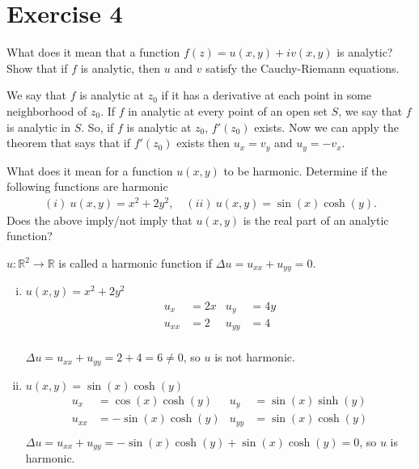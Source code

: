 \documentclass{report}
\def\R{\mathbb{R}}
\renewcommand{\sin}[1]{\operatorname{sin}\left(#1\right)}
\renewcommand{\cos}[1]{\operatorname{cos}\left(#1\right)}
\renewcommand{\sinh}[1]{\operatorname{sinh}\left(#1\right)}
\renewcommand{\cosh}[1]{\operatorname{cosh}\left(#1\right)}
\begin{document}
    \section*{Exercise 4}
    \begin{tcolorbox}[title=Part a]
        What does it mean that a function $f(z)=u(x,y)+iv(x,y)$ is analytic? Show that if $f$ is analytic, then $u$ and $v$ satisfy the Cauchy-Riemann equations.
    \end{tcolorbox}
    \noindent
    We say that $f$ is analytic at $z_0$ if it has a derivative at each point in some neighborhood of $z_0$. If $f$ in analytic at every point of an open set $S$, we say that $f$ is analytic in $S$. So, if $f$ is analytic at $z_0$, $f'(z_0)$ exists. Now we can apply the theorem that says that if $f'(z_0)$ exists then $u_x = v_y$ and $u_y = -v_x$.
    \begin{tcolorbox}[title=Part b]
        What does it mean for a function $u(x,y)$ to be harmonic. Determine if the following functions are harmonic
        \begin{align*}
            (i) \ u(x,y)=x^2+2y^2, \quad (ii) \ u(x,y)=\sin{x}\cosh{y}.
        \end{align*}
        Does the above imply/not imply that $u(x,y)$ is the real part of an analytic function?
    \end{tcolorbox}
    \noindent
    $u\colon\R^2 \longrightarrow \R$ is called a harmonic function if $\Delta u = u_{xx} + u_{yy} = 0$.
    \begin{enumerate}[(i)]
        \item $u(x,y)=x^2+2y^2$
        \begin{align*}
            u_x&=2x & u_y&=4y \\
            u_{xx}&=2 & u_{yy}&=4 \\
        \end{align*}

        $\Delta u = u_{xx} + u_{yy} = 2+4=6\neq 0$, so $u$ is not harmonic.
        \item $u(x,y)=\sin{x}\cosh{y}$
        \begin{align*}
            u_x&=\cos{x}\cosh{y} & u_y&=\sin{x}\sinh{y} \\
            u_{xx}&=-\sin{x}\cosh{y} & u_{yy}&=\sin{x}\cosh{y} \\
        \end{align*}
        $\Delta u = u_{xx} + u_{yy} =-\sin{x}\cosh{y}+\sin{x}\cosh{y}=0$, so $u$ is harmonic.
    \end{enumerate}
\end{document}
